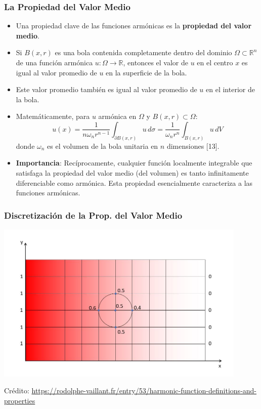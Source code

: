 \documentclass{beamer}
\begin{document}
\begin{frame}
  \frametitle{La Propiedad del Valor Medio}

  \begin{itemize}
          \small
    \item Una propiedad clave de las funciones armónicas es la \textbf{propiedad del valor medio}.
    \item Si $B(x, r)$ es una bola contenida completamente dentro del dominio $\Omega \subset \mathbb{R}^n$ de una función armónica $u: \Omega \to \mathbb{R}$, entonces el valor de $u$ en el centro $x$ es igual al valor promedio de $u$ en la superficie de la bola.
    \item Este valor promedio también es igual al valor promedio de $u$ en el interior de la bola.
    \item Matemáticamente, para $u$ armónica en $\Omega$ y $B(x,r) \subset \Omega$:
      \[ u(x) = \frac{1}{n\omega_n r^{n-1}}\int_{\partial B(x,r)}u\,d\sigma = \frac{1}{\omega_n r^n}\int_{B(x,r)}u\,dV \]
      donde $\omega_n$ es el volumen de la bola unitaria en $n$ dimensiones [13].
    \item \textbf{Importancia}: Recíprocamente, cualquier función localmente integrable que satisfaga la propiedad del valor medio (del volumen) es tanto infinitamente diferenciable como armónica. Esta propiedad esencialmente caracteriza a las funciones armónicas.
  \end{itemize}
  \end{frame}


  \begin{frame}
      \frametitle{Discretización de la Prop. del Valor Medio}
      \begin{center}
          \includegraphics[width=0.9\textwidth]{hot_plate_mean_1.jpg}
      \end{center}
      Crédito: \url{https://rodolphe-vaillant.fr/entry/53/harmonic-function-definitions-and-properties}


  \end{frame}
\end{document}
